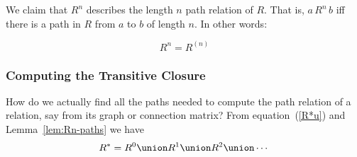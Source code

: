 We claim that $R^n$ describes the length $n$ path relation of $R$.  That
is, $a\, R^n\, b$ iff there is a path in $R$ from $a$ to $b$ of
length $n$.  In other words:
\begin{lemma}\label{lem:Rn-paths}
\[
R^n = R^{(n)}
\]
\end{lemma}

\subsubsection{Computing the Transitive Closure}

How do we actually find all the paths needed to compute the path relation
of a relation, say from its graph or connection matrix?  From
equation~(\ref{R*u}) and Lemma~\ref{lem:Rn-paths} we have
\[
R^* = R^0 \union  R^1 \union R^2 \union \cdots
\]

